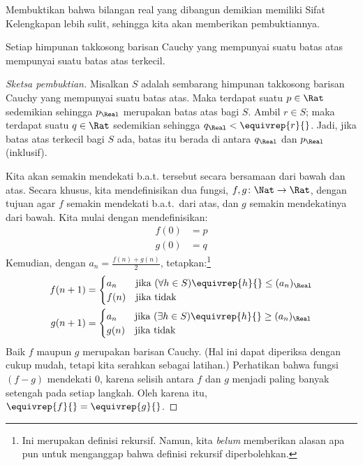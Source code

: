 \documentclass[../../../include/open-logic-section]{subfiles}
\begin{document}
Membuktikan bahwa bilangan real yang dibangun demikian memiliki Sifat
Kelengkapan lebih sulit, sehingga kita akan memberikan pembuktiannya.

\begin{thm}
Setiap himpunan takkosong barisan Cauchy yang mempunyai suatu batas atas
mempunyai suatu batas atas terkecil.
\end{thm}

\begin{proof}[Sketsa pembuktian] Misalkan $S$ adalah sembarang himpunan
takkosong barisan Cauchy yang mempunyai suatu batas atas. Maka terdapat suatu
$p \in \Rat$ sedemikian sehingga $p_{\Real}$ merupakan batas atas bagi $S$.
Ambil $r \in S$; maka terdapat suatu $q \in \Rat$ sedemikian sehingga
$q_{\Real} < \equivrep{r}{}$. Jadi, jika batas atas terkecil bagi $S$ ada, batas itu berada
di antara $q_\Real$ dan $p_\Real$ (inklusif).

Kita akan semakin mendekati b.a.t. tersebut secara bersamaan dari bawah dan
atas. Secara khusus, kita mendefinisikan dua fungsi, $f, g \colon \Nat \to
\Rat$, dengan tujuan agar $f$ semakin mendekati b.a.t.\ dari atas, dan $g$
semakin mendekatinya dari bawah. Kita mulai dengan mendefinisikan:
\begin{align*}
	f(0) &= p \\
	g(0) &= q
\end{align*}
Kemudian, dengan $a_n = \frac{f(n) + g(n)}{2}$, tetapkan:\footnote{Ini
merupakan definisi rekursif. Namun, kita \emph{belum} memberikan alasan apa
pun untuk menganggap bahwa definisi rekursif diperbolehkan.}
\begin{align*}
	f(n+1) &=
	\begin{cases}
		a_n &\text{jika }(\forall h \in S)\equivrep{h}{} \leq (a_n)_\Real\\
		f(n)&\text{jika tidak}
	\end{cases}\\
	g(n+1) &=
	\begin{cases}
		a_n &\text{jika }(\exists h \in S)\equivrep{h}{} \geq (a_n)_\Real\\
	 	g(n) &\text{jika tidak}
	\end{cases}
\end{align*}
Baik $f$ maupun $g$ merupakan barisan Cauchy. (Hal ini dapat diperiksa dengan
cukup mudah, tetapi kita serahkan sebagai latihan.) Perhatikan bahwa fungsi
$(f-g)$ mendekati $0$, karena selisih antara $f$ dan $g$ menjadi paling banyak setengah pada
setiap langkah. Oleh karena itu, $\equivrep{f}{} = \equivrep{g}{}$.


\end{proof}
\end{document}
